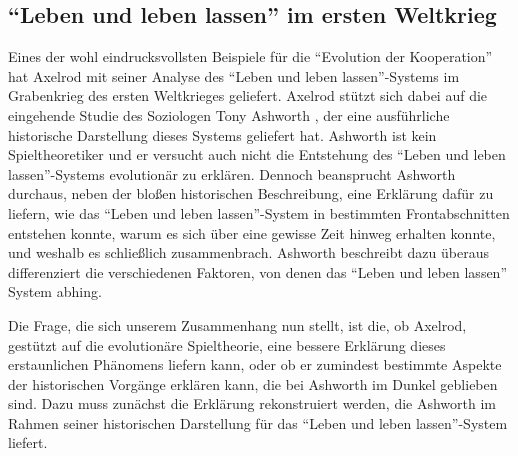 \documentclass[12pt,a4paper,ngerman]{article}
\begin{document}

\subsection{"`Leben und leben lassen"' im ersten Weltkrieg}

Eines der wohl eindrucksvollsten Beispiele für die "`Evolution der
Kooperation"' hat Axelrod mit seiner Analyse des "`Leben und leben
lassen"'-Systems im Grabenkrieg des ersten Weltkrieges geliefert\cite[S.
67-79]{axelrod:1984}. Axelrod stützt sich dabei auf die eingehende Studie des
Soziologen Tony Ashworth \cite{ashworth:1980}, der
eine ausführliche historische Darstellung dieses Systems geliefert
hat.  Ashworth ist kein Spieltheoretiker und er versucht auch nicht
die Entstehung des "`Leben und leben lassen"'-Systems evolutionär zu
erklären. Dennoch beansprucht Ashworth durchaus, neben der bloßen
historischen Beschreibung, eine Erklärung dafür zu liefern, wie das
"`Leben und leben lassen"'-System in bestimmten Frontabschnitten
entstehen konnte, warum es sich über eine gewisse Zeit hinweg erhalten
konnte, und weshalb es schließlich zusammenbrach.  Ashworth beschreibt
dazu überaus differenziert die verschiedenen Faktoren, von denen das
"`Leben und leben lassen"' System abhing.

Die Frage, die sich unserem Zusammenhang nun stellt, ist die, ob
Axelrod, gestützt auf die evolutionäre Spieltheorie, eine bessere
Erklärung dieses erstaunlichen Phänomens liefern kann, oder ob er
zumindest bestimmte Aspekte der historischen Vorgänge erklären kann,
die bei Ashworth im Dunkel geblieben sind. Dazu muss zunächst die
Erklärung rekonstruiert werden, die Ashworth im Rahmen seiner
historischen Darstellung für das "`Leben und leben lassen"'-System
liefert.
\end{document}
